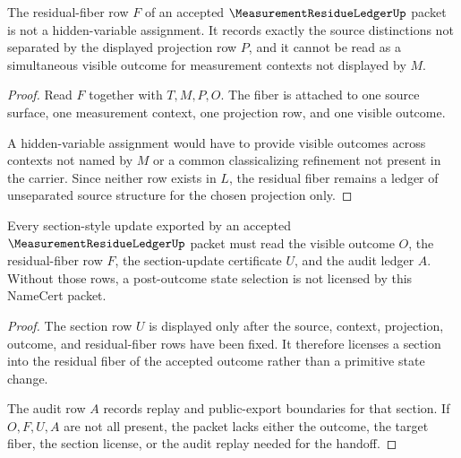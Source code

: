 \begin{theorem}
\label{thm:measurement-residue-ledger-non-hidden-variable-boundary}
The residual-fiber row $F$ of an accepted $\MeasurementResidueLedgerUp$ packet is not a hidden-variable assignment. It records exactly the source distinctions not separated by the displayed projection row $P$, and it cannot be read as a simultaneous visible outcome for measurement contexts not displayed by $M$.
\end{theorem}
\begin{proof}
Read $F$ together with $T,M,P,O$. The fiber is attached to one source surface, one measurement context, one projection row, and one visible outcome.

A hidden-variable assignment would have to provide visible outcomes across contexts not named by $M$ or a common classicalizing refinement not present in the carrier. Since neither row exists in $L$, the residual fiber remains a ledger of unseparated source structure for the chosen projection only.
\end{proof}

\begin{theorem}
\label{thm:measurement-residue-ledger-section-update-handoff}
Every section-style update exported by an accepted $\MeasurementResidueLedgerUp$ packet must read the visible outcome $O$, the residual-fiber row $F$, the section-update certificate $U$, and the audit ledger $A$. Without those rows, a post-outcome state selection is not licensed by this NameCert packet.
\end{theorem}
\begin{proof}
The section row $U$ is displayed only after the source, context, projection, outcome, and residual-fiber rows have been fixed. It therefore licenses a section into the residual fiber of the accepted outcome rather than a primitive state change.

The audit row $A$ records replay and public-export boundaries for that section. If $O,F,U,A$ are not all present, the packet lacks either the outcome, the target fiber, the section license, or the audit replay needed for the handoff.
\end{proof}



